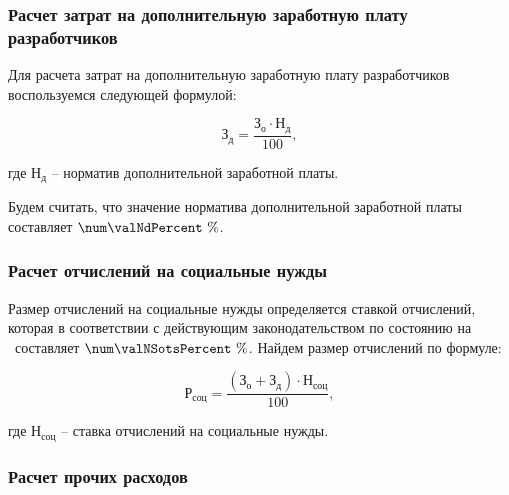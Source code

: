 \fixTableSectionSpace

\subsubsection{Расчет затрат на дополнительную заработную плату разработчиков}


Для расчета затрат на дополнительную заработную плату разработчиков воспользуемся
следующей формулой:


\begin{equation}
  \label{eq:econ:Zd}
  \text{З}_\text{д} = \frac{\text{З}_\text{о} \cdot \text{Н}_\text{д}}
    {100},
\end{equation}
\begin{explanationx}
  \item[где] $ \text{Н}_\text{д} $ -- норматив дополнительной заработной платы.
\end{explanationx}

Будем считать, что значение норматива дополнительной заработной платы составляет
$ \num\valNdPercent \ \% $.


\subsubsection{Расчет отчислений на социальные нужды}


Размер отчислений на социальные нужды определяется ставкой отчислений, которая
в соответствии с действующим законодательством по состоянию на \econCalcDate\
составляет $ \num\valNSotsPercent \ \% $. Найдем размер отчислений по формуле:

\begin{equation}
  \label{eq:econ:RSots}
  \text{Р}_\text{соц} = \frac{(\text{З}_\text{о} + \text{З}_\text{д}) \cdot \text{Н}_\text{соц}}
    {100},
\end{equation}
\begin{explanationx}
  \item[где] $ \text{Н}_\text{соц} $ -- ставка отчислений на социальные нужды.
\end{explanationx}


\subsubsection{Расчет прочих расходов}

